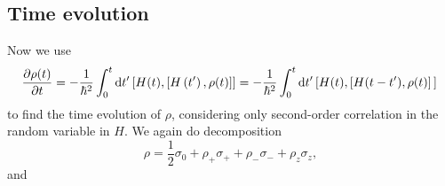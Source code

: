 \documentclass[hyperref, a4paper]{article}
\begin{document}
\subsection{Time evolution}

Now we use 
\begin{equation}
    \frac{\partial \rho(t)}{\partial t}=-\frac{1}{\hbar^2} \int_0^t \dd t^{\prime}\left[H(t),\left[H\left(t^{\prime}\right), \rho(t)\right]\right] 
    = - \frac{1}{\hbar^2} \int_{0}^t \dd{t'} \comm*{H(t)}{\comm*{H(t - t')}{\rho(t)}}
\end{equation}
to find the time evolution of $\rho$, 
considering only second-order correlation 
in the random variable in $H$.
We again do decomposition
\begin{equation}
    \rho = \frac{1}{2} \sigma_0 + \rho_+ \sigma_+ + \rho_- \sigma_- + \rho_z \sigma_z,
\end{equation}
and 
\end{document}

